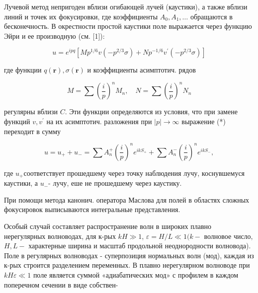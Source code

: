 \documentclass[10pt]{article}
\begin{document}
Лучевой метод непригоден вблизи огибающей лучей (каустики), а также вблизи линий и точек их фокусировки, где коэффициенты $A_{0}, A_{1}, \ldots$ обращаются в бесконечность. В окрестности простой каустики поле выражается через функцию Эйри и ее производную (см. [1]):



\[

u=e^{i p q}\left[M p^{1 / 6} v\left(-p^{2 / 3} \sigma\right)+N p^{-1 / 6} v^{\prime}\left(-p^{2 / 3} \sigma\right)\right]

\]



где функции $q(\boldsymbol{r}), \sigma(\boldsymbol{r})$ и коэффициенты асимптотич. рядов



\[

M=\sum\left(\frac{i}{p}\right)^{n} M_{n}, \quad N=\sum\left(\frac{i}{p}\right)^{n} N_{n}

\]



регулярны вблизи $C$. Эти функции определяются из условия, что при замене функций $v, v^{\prime}$ на их асимптотич. разложения при $|p| \rightarrow \infty$ выражение (*) переходит в сумму



\[

u=u_{+}+u_{-}=\sum A_{n}^{+}\left(\frac{i}{p}\right)^{n} e^{i k S_{+}}+\sum A_{n}^{-}\left(\frac{i}{p}\right)^{n} e^{i k S_{-}},

\]



где $u_{+}$соответствует прошедшему через точку наблюдения лучу, коснувшемуся каустики, а $u_{-}$- лучу, еше не прошедшему через каустику.



При помощи метода канонич. оператора Маслова для полей в областях сложных фокусировок выписываются интегральные представления.



Особый случай составляет распространение волн в широких плавно нерегулярных волноводах, для к-рых $k H \gg 1$, $\varepsilon=H / L \ll 1(k-$ волновое число, $H, L-$ характерные ширина и масштаб продольной неоднородности волновода). Поле в регулярных волноводах - суперпозиция нормальных волн (мод), каждая из к-рых строится разделением переменных. В плавно нерегулярном волноводе при $k H \varepsilon \ll 1$ поле является суммой «адиабатических мод» с профилем в каждом поперечном сечении в виде собствен-
\end{document}
